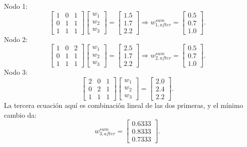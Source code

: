 \documentclass[11pt,a4paper]{article}
\begin{document}
Nodo 1:
\[
\begin{bmatrix}
1&0&1\\
0&1&1\\
1&1&1
\end{bmatrix}
\begin{bmatrix}
w_1\\w_2\\w_3
\end{bmatrix}
=
\begin{bmatrix}
1.5\\1.7\\2.2
\end{bmatrix}
\Rightarrow
w_{1,after}^{sum}=
\begin{bmatrix}
0.5\\0.7\\1.0
\end{bmatrix}.
\]
Nodo 2:
\[
\begin{bmatrix}
1&0&2\\
0&1&1\\
1&1&1
\end{bmatrix}
\begin{bmatrix}
w_1\\w_2\\w_3
\end{bmatrix}
=
\begin{bmatrix}
2.5\\1.7\\2.2
\end{bmatrix}
\Rightarrow
w_{2,after}^{sum}=
\begin{bmatrix}
0.5\\0.7\\1.0
\end{bmatrix}.
\]
Nodo 3:
\[
\begin{bmatrix}
2&0&1\\
0&2&1\\
1&1&1
\end{bmatrix}
\begin{bmatrix}
w_1\\w_2\\w_3
\end{bmatrix}
=
\begin{bmatrix}
2.0\\2.4\\2.2
\end{bmatrix}.
\]
La tercera ecuación aquí es combinación lineal de las dos primeras, y el
mínimo cambio da:
\[
w_{3,after}^{sum}=
\begin{bmatrix}
0.6333\\0.8333\\0.7333
\end{bmatrix}.
\]
\end{document}
